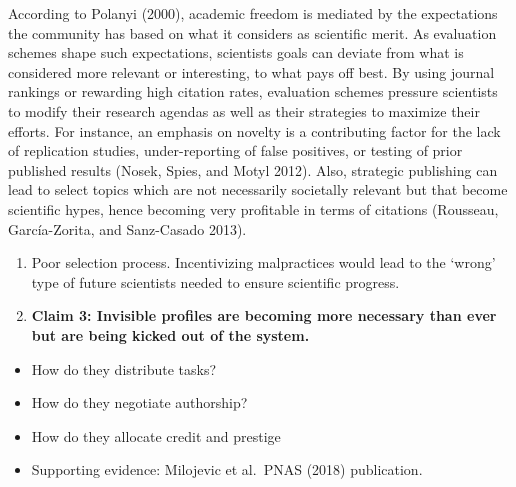 \documentclass[]{elsarticle} %
\providecommand{\tightlist}{%
  \setlength{\itemsep}{0pt}\setlength{\parskip}{0pt}}
\begin{document}
According to Polanyi (2000), academic freedom is mediated by the
expectations the community has based on what it considers as scientific
merit. As evaluation schemes shape such expectations, scientists goals
can deviate from what is considered more relevant or interesting, to
what pays off best. By using journal rankings or rewarding high citation
rates, evaluation schemes pressure scientists to modify their research
agendas as well as their strategies to maximize their efforts. For
instance, an emphasis on novelty is a contributing factor for the lack
of replication studies, under-reporting of false positives, or testing
of prior published results (Nosek, Spies, and Motyl 2012). Also,
strategic publishing can lead to select topics which are not necessarily
societally relevant but that become scientific hypes, hence becoming
very profitable in terms of citations (Rousseau, García-Zorita, and
Sanz-Casado 2013).

\begin{enumerate}
\def\labelenumi{\arabic{enumi}.}
\setcounter{enumi}{1}
\item
  Poor selection process. Incentivizing malpractices would lead to the
  `wrong' type of future scientists needed to ensure scientific
  progress.
\item
  \textbf{Claim 3: Invisible profiles are becoming more necessary than
  ever but are being kicked out of the system.}
\end{enumerate}

\begin{itemize}
\tightlist
\item
  How do they distribute tasks?
\item
  How do they negotiate authorship?
\item
  How do they allocate credit and prestige
\item
  Supporting evidence: Milojevic et al.~PNAS (2018) publication.
\end{itemize}
\end{document}
